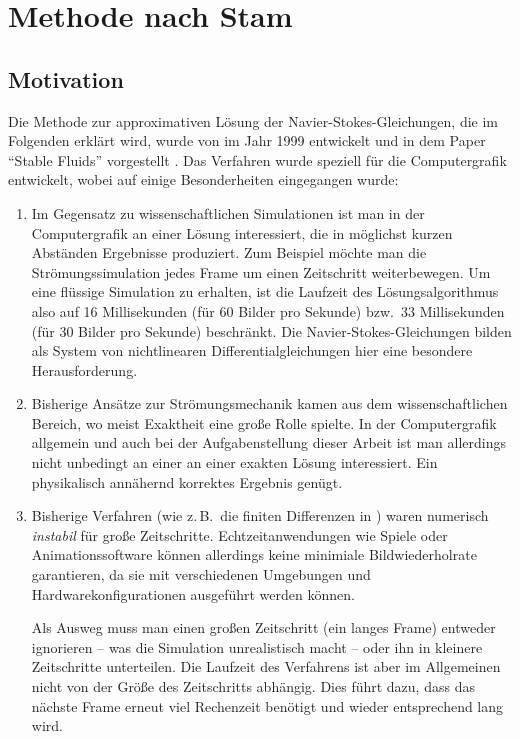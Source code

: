 \section{Methode nach Stam}
\label{sec:stam}

\subsection{Motivation}

Die Methode zur approximativen Lösung der Navier-Stokes-Gleichungen, die im
Folgenden erklärt wird, wurde von  im Jahr 1999 entwickelt
und in dem Paper "`Stable Fluids"' vorgestellt \cite{Stam1999}. Das Verfahren
wurde speziell für die Computergrafik entwickelt, wobei auf einige
Besonderheiten eingegangen wurde:

\begin{enumerate}
\item
	Im Gegensatz zu wissenschaftlichen Simulationen ist man in der
	Computergrafik an einer Lösung interessiert, die in möglichst kurzen
	Abständen Ergebnisse produziert. Zum Beispiel möchte man die
	Strömungssimulation jedes Frame um einen Zeitschritt weiterbewegen. Um
	eine flüssige Simulation zu erhalten, ist die Laufzeit des
	Lösungsalgorithmus also auf 16 Millisekunden (für 60 Bilder pro Sekunde)
	bzw.\ 33 Millisekunden (für 30 Bilder pro Sekunde) beschränkt. Die
	Navier-Stokes-Gleichungen bilden als System von nichtlinearen
	Differentialgleichungen hier eine besondere Herausforderung.
\item
	Bisherige Ansätze zur Strömungsmechanik kamen aus dem
	wissenschaftlichen Bereich, wo meist Exaktheit eine große Rolle
	spielte. In der Computergrafik allgemein und auch bei der
	Aufgabenstellung dieser Arbeit ist man allerdings nicht unbedingt an
	einer an einer exakten Lösung interessiert.  Ein physikalisch
	annähernd korrektes Ergebnis genügt.
\item
	Bisherige Verfahren (wie z.\,B.\ die finiten Differenzen in
	\cite{Foster1997}) waren numerisch \emph{instabil} für große
	Zeitschritte. Echtzeitanwendungen wie Spiele oder Animationssoftware
	können allerdings keine minimiale Bildwiederholrate garantieren, da sie mit
	verschiedenen Umgebungen und Hardwarekonfigurationen ausgeführt werden
	können.

	Als Ausweg muss man einen großen Zeitschritt (ein langes Frame) entweder
	ignorieren -- was die Simulation unrealistisch macht -- oder ihn in
	kleinere Zeitschritte unterteilen. Die Laufzeit des Verfahrens ist aber
	im Allgemeinen nicht von der Größe des Zeitschritts abhängig. Dies führt
	dazu, dass das nächste Frame erneut viel Rechenzeit benötigt und wieder
	entsprechend lang wird.


\end{enumerate}
